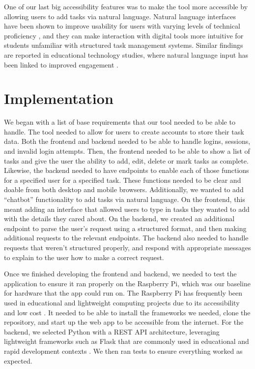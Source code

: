 \documentclass[11pt,oneside]{article}
\begin{document}
\begin{enumerate}
One of our last big accessibility features was to make the tool more accessible by allowing users to add tasks via natural language.  Natural language interfaces have been shown to improve usability for users with varying levels of technical proficiency \citep{shneiderman2010designing}, and they can make interaction with digital tools more intuitive for students unfamiliar with structured task management systems. Similar findings are reported in educational technology studies, where natural language input has been linked to improved engagement \citep{junco2012relationship}.


\section{Implementation}
We began with a list of base requirements that our tool needed to be able to handle. The tool needed to allow for users to create accounts to store their task data. Both the frontend and backend needed to be able to handle logins, sessions, and invalid login attempts. Then, the frontend needed to be able to show a list of tasks and give the user the ability to add, edit, delete or mark tasks as complete. Likewise, the backend needed to have endpoints to enable each of those functions for a specified user for a specified task. These functions needed to be clear and doable from both desktop and mobile browsers. Additionally, we wanted to add “chatbot” functionality to add tasks via natural language. On the frontend, this meant adding an interface that allowed users to type in tasks they wanted to add with the details they cared about. On the backend, we created an additional endpoint to parse the user’s request using a structured format, and then making additional requests to the relevant endpoints. The backend also needed to handle requests that weren’t structured properly, and respond with appropriate messages to explain to the user how to make a correct request. 

Once we finished developing the frontend and backend, we needed to test the application to ensure it ran properly on the Raspberry Pi, which was our baseline for hardware that the app could run on. The Raspberry Pi has frequently been used in educational and lightweight computing projects due to its accessibility and low cost \citep{richardson2014getting}. It needed to be able to install the frameworks we needed, clone the repository, and start up the web app to be accessible from the internet. For the backend, we selected Python with a REST API architecture, leveraging lightweight frameworks such as Flask that are commonly used in educational and rapid development contexts \citep{grinberg2018flask}. We then ran tests to ensure everything worked as expected.



\end{enumerate}
\end{document}
